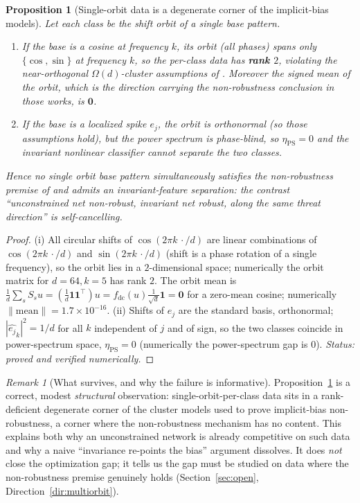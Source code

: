 \documentclass[11pt]{article}
\theoremstyle{plain}
\newtheorem{proposition}{Proposition}
\theoremstyle{definition}
\theoremstyle{remark}
\newtheorem{remark}{Remark}
\newcommand{\fdc}{f_{\mathrm{dc}}}
\newcommand{\one}{\mathbf 1}
\begin{document}
\begin{proposition}[Single-orbit data is a degenerate corner of the implicit-bias models]\label{prop:rank}
Let each class be the shift orbit of a single base pattern.
\begin{enumerate}[leftmargin=1.4em,topsep=2pt,itemsep=1pt]
\item If the base is a cosine at frequency $k$, its orbit (all phases) spans only $\{\cos,\sin\}$ at frequency $k$, so the per-class data has \textbf{rank $2$}, violating the near-orthogonal $\Omega(d)$-cluster assumptions of \citet{frei2023double,li2025feature}. Moreover the signed mean of the orbit, which is the direction carrying the non-robustness conclusion in those works, is $\mathbf 0$.
\item If the base is a localized spike $e_j$, the orbit is orthonormal (so those assumptions hold), but the power spectrum is phase-blind, so $\eta_{\mathrm{PS}}=0$ and the invariant nonlinear classifier cannot separate the two classes.
\end{enumerate}
Hence no single orbit base pattern simultaneously satisfies the non-robustness premise of \citet{frei2023double,li2025feature} and admits an invariant-feature separation: the contrast ``unconstrained net non-robust, invariant net robust, along the same threat direction'' is self-cancelling.
\end{proposition}
\begin{proof}
(i) All circular shifts of $\cos(2\pi k\,\cdot/d)$ are linear combinations of $\cos(2\pi k\,\cdot/d)$ and $\sin(2\pi k\,\cdot/d)$ (shift is a phase rotation of a single frequency), so the orbit lies in a $2$-dimensional space; numerically the orbit matrix for $d=64,k=5$ has rank $2$. The orbit mean is $\tfrac1d\sum_s S_s u=(\tfrac1d\one\one^\top)u=\fdc(u)\tfrac1{\sqrt d}\one=\mathbf 0$ for a zero-mean cosine; numerically $\|\text{mean}\|=1.7\times10^{-16}$. (ii) Shifts of $e_j$ are the standard basis, orthonormal; $|\widehat{e_j}_k|^2=1/d$ for all $k$ independent of $j$ and of sign, so the two classes coincide in power-spectrum space, $\eta_{\mathrm{PS}}=0$ (numerically the power-spectrum gap is $0$). \emph{Status: proved and verified numerically.}
\end{proof}

\begin{remark}[What survives, and why the failure is informative]
Proposition~\ref{prop:rank} is a correct, modest \emph{structural} observation: single-orbit-per-class data sits in a rank-deficient degenerate corner of the cluster models used to prove implicit-bias non-robustness, a corner where the non-robustness mechanism has no content. This explains both why an unconstrained network is already competitive on such data and why a naive ``invariance re-points the bias'' argument dissolves. It does \emph{not} close the optimization gap; it tells us the gap must be studied on data where the non-robustness premise genuinely holds (Section~\ref{sec:open}, Direction~\ref{dir:multiorbit}).
\end{remark}
\end{document}
